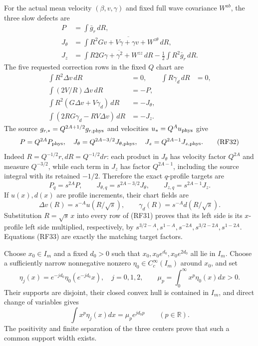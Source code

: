 \documentclass[10pt,a4paper]{article}
\begin{document}
For the actual mean velocity \((\beta,v,\gamma)\) and fixed full
wave covariance \(W^{ab}\), the three slow defects are
\[
\begin{split}
P&=\int\bar g_r\,dR,\\
J_\theta&=\int R^2\overline{Gv+V\gamma+\gamma v+W^{z\theta}}\,dR,\\
J_z&=\int R\overline{2G\gamma+\gamma^2+W^{zz}}\,dR
-\frac12\int R^2\bar g_r\,dR.
\end{split}
\tag{RF30}
\]
The five requested correction rows in the fixed \(Q\) chart are
\[
\begin{aligned}
\int R^2\Delta v\,dR&=0,&\int R\gamma_d\,dR&=0,\\
\int(2V/R)\Delta v\,dR&=-P,\\
\int R^2(G\Delta v+V\gamma_d)\,dR&=-J_\theta,\\
\int(2RG\gamma_d-RV\Delta v)\,dR&=-J_z.
\end{aligned}
\tag{RF31}
\]
The source \(g_{r,*}=Q^{2A+1/2}g_{r,\rm phys}\) and
velocities \(u_*=Q^Au_{\rm phys}\) give
\[
P=Q^{2A}P_{\rm phys},\quad
J_\theta=Q^{2A-3/2}J_{\theta,\rm phys},\quad
J_z=Q^{2A-1}J_{z,\rm phys}.
\tag{RF32}
\]
Indeed \(R=Q^{-1/2}r,dR=Q^{-1/2}dr\): each product in
\(J_\theta\) has velocity factor \(Q^{2A}\) and measure
\(Q^{-3/2}\), while each term in \(J_z\) has factor
\(Q^{2A-1}\), including the source integral with its retained
\(-1/2\). Therefore the exact \(q\)-profile targets are
\[
P_q=s^{2A}P,\qquad
J_{\theta,q}=s^{2A-3/2}J_\theta,\qquad
J_{z,q}=s^{2A-1}J_z.
\tag{RF33}
\]
If \(u(x),d(x)\) are profile increments, their chart fields are
\[
\Delta v(R)=s^{-A}u(R/\sqrt s),\qquad
\gamma_d(R)=s^{-A}d(R/\sqrt s).
\tag{RF34}
\]
Substitution \(R=\sqrt s\,x\) into every row of (RF31) proves
that its left side is its \(x\)-profile left side multiplied,
respectively, by
\(s^{3/2-A},s^{1-A},s^{-2A},s^{3/2-2A},s^{1-2A}\).
Equations (RF33) are exactly the matching target factors.

Choose \(x_0\in I_m\) and a fixed \(d_0>0\) such that
\(x_0,x_0e^{d_0},x_0e^{2d_0}\) all lie in \(I_m\).
Choose a sufficiently narrow nonnegative nonzero
\(\eta_0\in C_c^\infty(I_m)\) around \(x_0\), and set
\[
\eta_j(x)=e^{-jd_0}\eta_0(e^{-jd_0}x),\quad j=0,1,2,
\qquad\mu_p=\int_0^\infty x^p\eta_0(x)dx>0.
\]
Their supports are disjoint, their closed convex hull is contained in
\(I_m\), and direct change of variables gives
\[
\int x^p\eta_j(x)dx=\mu_p e^{jd_0p}\qquad(p\in\mathbb R).
\tag{RF35}
\]
The positivity and finite separation of the three centers prove that
such a common support width exists.
\end{document}
